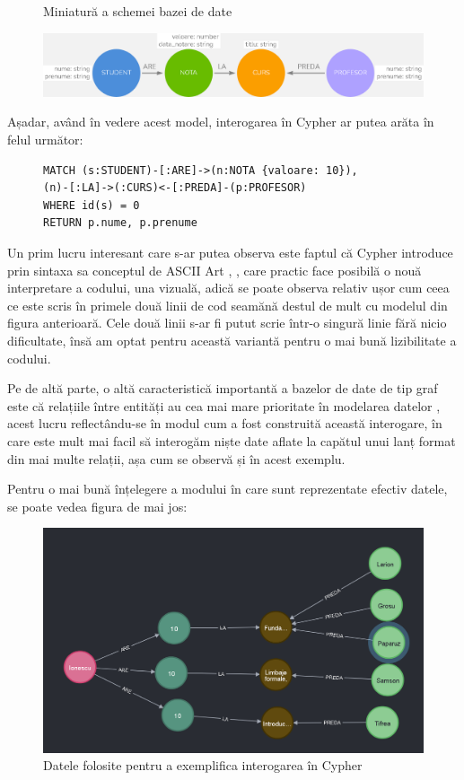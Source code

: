 \documentclass[12pt,a4paper]{report}
\begin{document}
\begin{figure}[H]
\centering
\caption{Miniatură a schemei bazei de date}
\includegraphics[scale=0.4]{exemplu_3_neo4j}
\caption*{}
\end{figure}


Așadar, având în vedere acest model, interogarea în Cypher ar putea arăta în felul următor:

\begin{figure}[H]
\centering
\begin{BVerbatim}
MATCH (s:STUDENT)-[:ARE]->(n:NOTA {valoare: 10}),
(n)-[:LA]->(:CURS)<-[:PREDA]-(p:PROFESOR)
WHERE id(s) = 0
RETURN p.nume, p.prenume
\end{BVerbatim}
\end{figure}



Un prim lucru interesant care s-ar putea observa este faptul că Cypher introduce prin sintaxa sa conceptul de ASCII Art \cite{8}, \cite{9}, care practic face posibilă o nouă interpretare a codului, una vizuală, adică se poate observa relativ ușor cum ceea ce este scris în primele două linii de cod seamănă destul de mult cu modelul din figura anterioară.
Cele două linii s-ar fi putut scrie într-o singură linie fără nicio dificultate, însă am optat pentru această variantă pentru o mai bună lizibilitate a codului.

Pe de altă parte, o altă caracteristică importantă a bazelor de date de tip graf este că relațiile între entități au cea mai mare prioritate în modelarea datelor \cite{10}, acest lucru reflectându-se în modul cum a fost construită această interogare, în care este mult mai facil să interogăm niște date aflate la capătul unui lanț format din mai multe relații, așa cum se observă și în acest exemplu.

Pentru o mai bună înțelegere a modului în care sunt reprezentate efectiv datele, se poate vedea figura de mai jos:

\begin{figure}[H]
\centering
\caption{}
\includegraphics[scale=0.5]{exemplu_4_neo4j}
\caption*{Datele folosite pentru a exemplifica interogarea în Cypher}
\end{figure}
\end{document}
